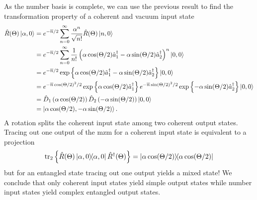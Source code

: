 As the number basis is complete, we can use the previous result to find the transformation property of a coherent and vacuum input state
\begin{equation}
	\begin{split}
		\hat{R}(\Theta)
		\ket{\alpha,0}
		&=
		e^{-\overline{n}/2}
		\sum_{n=0}^\infty
		\frac{\alpha^n}{\sqrt{n!}}
		\hat{R}(\Theta)
		\ket{n,0}
		\\
		&=
		e^{-\overline{n}/2}
		\sum_{n=0}^\infty
		\frac{1}{n!}
		\left(
			\alpha
			\cos(\Theta/2)
			\hat{a}_1^\dagger
			-
			\alpha
			\sin(\Theta/2)
			\hat{a}_2^\dagger
		\right)^n
		\ket{0,0}
		\\
		&=
		e^{-\overline{n}/2}
		\exp\left\{
			\alpha
			\cos(\Theta/2)
			\hat{a}_1^\dagger
			-
			\alpha
			\sin(\Theta/2)
			\hat{a}_2^\dagger
		\right\}
		\ket{0,0}
		\\
		&=
		e^{-\overline{n}\cos(\Theta/2)^2/2}
		\exp\left\{
			\alpha
			\cos(\Theta/2)
			\hat{a}_1^\dagger
		\right\}
		e^{-\overline{n}\sin(\Theta/2)^2/2}
		\exp\left\{
			-
			\alpha
			\sin(\Theta/2)
			\hat{a}_2^\dagger
		\right\}
		\ket{0,0}
		\\
		&=
		\hat{D}_1\left(
			\alpha
			\cos(\Theta/2)
		\right)
		\hat{D}_2\left(
			-
			\alpha
			\sin(\Theta/2)
		\right)
		\ket{0,0}
		\\
		&=
		\ket{\alpha\cos(\Theta/2),-\alpha\sin(\Theta/2)}
		.
	\end{split}
\end{equation}
A rotation splits the coherent input state among two coherent output states.
Tracing out one output of the \gls{mzm} for a coherent input state is equivalent to a projection
\begin{equation}
	\tr_2\left\{
		\hat{R}(\Theta)
		\ketbra{\alpha,0}
		\hat{R}^\dagger(\Theta)
	\right\}
	=
	\ketbra{\alpha\cos(\Theta/2)}
\end{equation}
but for an entangled state tracing out one output yields a mixed state!
We conclude that only coherent input states yield simple output states while number input states yield complex entangled output states.

